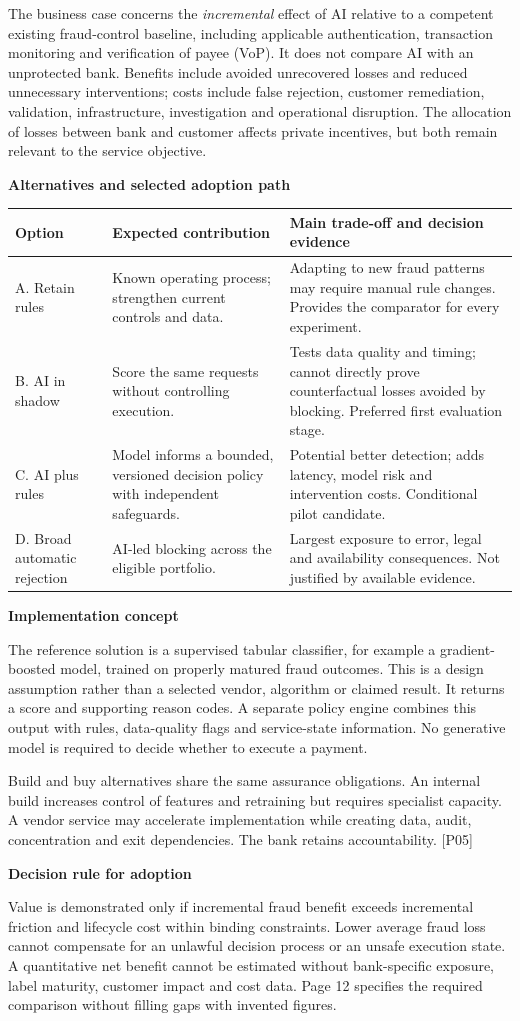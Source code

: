\documentclass[11pt,a4paper]{article}
\newcommand{\sub}[1]{\par\vspace{2mm}\textbf{\color{ink}#1}\par}
\newcommand{\src}[1]{{\small[#1]}}
\begin{document}
The business case concerns the \emph{incremental} effect of AI relative to a competent existing fraud-control baseline, including applicable authentication, transaction monitoring and verification of payee (VoP). It does not compare AI with an unprotected bank. Benefits include avoided unrecovered losses and reduced unnecessary interventions; costs include false rejection, customer remediation, validation, infrastructure, investigation and operational disruption. The allocation of losses between bank and customer affects private incentives, but both remain relevant to the service objective.
\sub{Alternatives and selected adoption path}
\par{\small\begin{tabularx}{\textwidth}{@{}P{25mm}YY@{}}\toprule
Option & Expected contribution & Main trade-off and decision evidence\\\midrule
A. Retain rules & Known operating process; strengthen current controls and data. & Adapting to new fraud patterns may require manual rule changes. Provides the comparator for every experiment.\\
B. AI in shadow & Score the same requests without controlling execution. & Tests data quality and timing; cannot directly prove counterfactual losses avoided by blocking. Preferred first evaluation stage.\\
C. AI plus rules & Model informs a bounded, versioned decision policy with independent safeguards. & Potential better detection; adds latency, model risk and intervention costs. Conditional pilot candidate.\\
D. Broad automatic rejection & AI-led blocking across the eligible portfolio. & Largest exposure to error, legal and availability consequences. Not justified by available evidence.\\\bottomrule
\end{tabularx}\par}
\sub{Implementation concept}
The reference solution is a supervised tabular classifier, for example a gradient-boosted model, trained on properly matured fraud outcomes. This is a design assumption rather than a selected vendor, algorithm or claimed result. It returns a score and supporting reason codes. A separate policy engine combines this output with rules, data-quality flags and service-state information. No generative model is required to decide whether to execute a payment.

Build and buy alternatives share the same assurance obligations. An internal build increases control of features and retraining but requires specialist capacity. A vendor service may accelerate implementation while creating data, audit, concentration and exit dependencies. The bank retains accountability. \src{P05}
\sub{Decision rule for adoption}
Value is demonstrated only if incremental fraud benefit exceeds incremental friction and lifecycle cost within binding constraints. Lower average fraud loss cannot compensate for an unlawful decision process or an unsafe execution state. A quantitative net benefit cannot be estimated without bank-specific exposure, label maturity, customer impact and cost data. Page 12 specifies the required comparison without filling gaps with invented figures.
\end{document}
